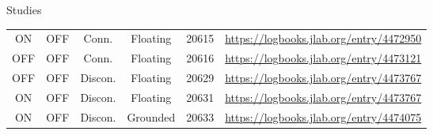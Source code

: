 \begin{frame}{Studies}
{\begin{tabular}{|c|c|c|c|c|c|}
		ON & OFF & Conn. & Floating  & 20615 & \small \url{https://logbooks.jlab.org/entry/4472950} \\
		OFF & OFF & Conn. & Floating  & 20616 & \small \url{https://logbooks.jlab.org/entry/4473121} \\
		OFF & OFF & Discon. & Floating  & 20629 & \small \url{https://logbooks.jlab.org/entry/4473767}\\
		ON & OFF & Discon. & Floating  & 20631 & \small \url{https://logbooks.jlab.org/entry/4473767}\\
		ON & OFF & Discon. & Grounded & 20633 & \small \url{https://logbooks.jlab.org/entry/4474075}\\\hline
	\end{tabular}
}
\end{frame}